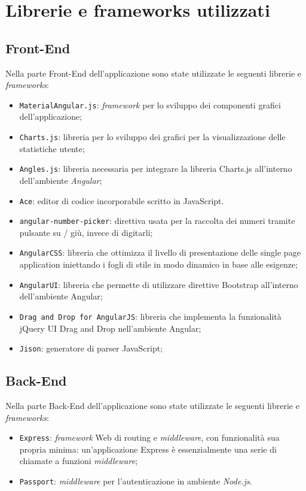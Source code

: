 \newpage
\section{Librerie e frameworks utilizzati}
\subsection{Front-End}
Nella parte Front-End dell'applicazione sono state utilizzate le seguenti librerie e \textit{frameworks}:
\begin{itemize}
	\item \texttt{MaterialAngular.js}: \textit{framework} per lo sviluppo dei componenti grafici dell'applicazione;
	\item \texttt{Charts.js}: libreria per lo sviluppo dei grafici per la visualizzazione delle statistiche
	utente;
	\item \texttt{Angles.js}: libreria necessaria per integrare la libreria Charts.js all'interno
	dell'ambiente \textit{Angular};
	\item \texttt{Ace}: editor di codice incorporabile scritto in JavaScript.
	\item
	\texttt{angular-number-picker}: direttiva usata per la raccolta dei numeri tramite pulsante su / giù, invece di digitarli;
	\item
	\texttt{AngularCSS}: libreria che ottimizza il livello di presentazione delle single page application iniettando i fogli di stile in modo dinamico in base alle esigenze;
	\item 
	\texttt{AngularUI}: libreria che permette di utilizzare direttive Bootstrap all'interno dell'ambiente Angular;
	\item
	\texttt{Drag and Drop for AngularJS}: libreria che implementa la funzionalità jQuery UI Drag and Drop nell'ambiente Angular;
	\item \texttt{Jison}: generatore di parser JavaScript;
\end{itemize}
\subsection{Back-End}
Nella parte Back-End dell'applicazione sono state utilizzate le seguenti librerie e \textit{frameworks}:
\begin{itemize}
	\item \texttt{Express}: \textit{framework} Web di routing e \textit{middleware}, con funzionalità sua propria minima: un'applicazione Express è essenzialmente una serie di chiamate a funzioni \textit{middleware};
	\item \texttt{Passport}: \textit{middleware} per l'autenticazione in ambiente \textit{Node.js}.
\end{itemize}
